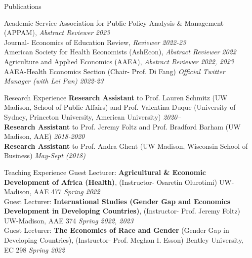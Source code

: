 \documentclass{resume} %
\begin{document}
\begin{rSection}{Publications}
\begin{rSection}{Academic Service}%
Association for Public Policy Analysis \& Management (APPAM),  \textit{Abstract Reviewer}  {\hfill \em 2023} \\
Journal- Economics of Education Review, \textit{Reviewer} {\hfill\textit{2022-23}} \\ 
American Society for Health Economists (AshEcon), \textit{Abstract Reviewer} {\hfill\textit{2022}} \\ 
Agriculture and Applied Economics (AAEA), \textit{Abstract Reviewer} {\hfill \textit{2022, 2023}}\\
AAEA-Health Economics Section (Chair- Prof. Di Fang) \textit{Official Twitter Manager (with Lei Pan)} {\hfill \textit{2022-23}}  
\end{rSection}



\begin{rSection}{Research Experience}
\textbf{Research Assistant} to Prof. Lauren Schmitz (UW Madison, School of Public Affairs) and Prof. Valentina Duque (University of Sydney, Princeton University, American University) \hfill \textit{2020--} \\
\textbf{Research Assistant} to Prof. Jeremy Foltz and Prof. Bradford Barham (UW Madison, AAE) \hfill \textit{2018-2020} \\
\textbf{Research Assistant} to Prof. Andra Ghent (UW Madison, Wisconsin School of Business) \hfill \textit{May-Sept (2018)}
\end{rSection}


\begin{rSection}{Teaching Experience}
Guest Lecturer: \textbf{Agricultural \& Economic Development of Africa (Health)}, (Instructor- Osaretin Olurotimi) UW-Madison, AAE 477
 \hfill \textit{Spring 2022} \\
Guest Lecturer: \textbf{International Studies (Gender Gap and Economics Development in Developing Countries)}, (Instructor- Prof. Jeremy Foltz) UW-Madison, AAE 374
 \hfill \textit{Spring 2022, 2023} \\
Guest Lecturer: \textbf{The Economics of Race and Gender} (Gender Gap in Developing Countries), (Instructor- Prof. Meghan I. Esson) Bentley University, EC 298
 \hfill \textit{Spring 2022}
\end{rSection}




\end{rSection}
\end{document}
